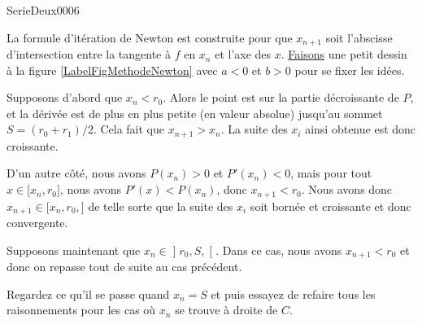 
\begin{corrige}{SerieDeux0006}

	La formule d'itération de Newton est construite pour que $x_{n+1}$ soit l'abscisse d'intersection entre la tangente à $f$ en $x_n$ et l'axe des $x$. \href{http://gitorious.org/phystricks}{Faisons} une petit dessin à la figure \ref{LabelFigMethodeNewton} avec $a<0$ et $b>0$ pour se fixer les idées.

\newcommand{\CaptionFigMethodeNewton}{La méthode de Newton pour une parabole}


Supposons d'abord que $x_n<r_0$. Alors le point est sur la partie décroissante de $P$, et la dérivée est de plus en plus petite (en valeur absolue) jusqu'au sommet $S=(r_0+r_1)/2$. Cela fait que $x_{n+1}>x_n$. La suite des $x_i$ ainsi obtenue est donc croissante.

D'un autre côté, nous avons $P(x_n)>0$ et $P'(x_n)<0$, mais pour tout $x\in\mathopen[ x_n , r_0 \mathclose]$, nous avons $P'(x)<P(x_n)$, donc $x_{n+1}<r_0$. Nous avons donc $x_{n+1}\in\mathopen[ x_n,r_0 ,  \mathclose]$ de telle sorte que la suite des $x_i$ soit bornée et croissante et donc convergente.

Supposons maintenant que $x_n\in\mathopen] r_0,S ,  \mathclose[$. Dans ce cas, nous avons $x_{n+1}<r_0$ et donc on repasse tout de suite au cas précédent.

Regardez ce qu'il se passe quand $x_n=S$ et puis essayez de refaire tous les raisonnements pour les cas où $x_n$ se trouve à droite de $C$.

\end{corrige}
